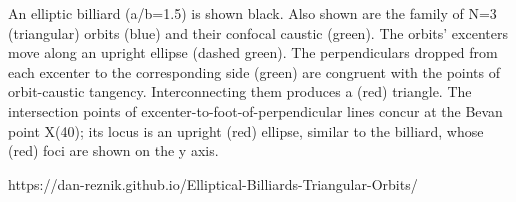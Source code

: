 An elliptic billiard (a/b=1.5) is shown black. Also shown are the family of N=3 (triangular) orbits (blue) and their confocal caustic (green). The orbits' excenters move along an upright ellipse (dashed green). The perpendiculars dropped from each excenter to the corresponding side (green) are congruent with the points of orbit-caustic tangency. Interconnecting them produces a (red) triangle. The intersection points of excenter-to-foot-of-perpendicular lines concur at the Bevan point X(40); its locus is an upright (red) ellipse, similar to the billiard, whose (red) foci are shown on the y axis.

https://dan-reznik.github.io/Elliptical-Billiards-Triangular-Orbits/